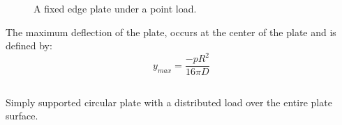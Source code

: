 \documentclass[10pt,letterpaper]{report}
\numberwithin{equation}{chapter}
\begin{document}
\begin{figure}[!ht]
\centering
\label{fig:fpp}
    \hfill
    \caption{A fixed edge plate under a point load.}
    \label{fig:dummy}
\end{figure}
The maximum deflection of the plate, occurs at the center of the plate and is defined by:
\[y_{max} = \frac{-p R^2}{16 \pi D}\]


\subsection{}
\label{subsec:ppd} %
Simply supported circular plate with a distributed load over the entire plate surface.
\end{document}
